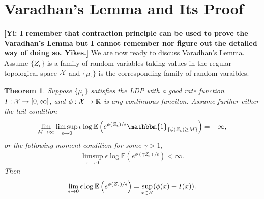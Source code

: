 \documentclass[10pt]{article}
\def\X{{\cal X}}
\newcommand{\e}{\mathbb{E}}
\newcommand{\gy}[1]{\textbf{\color{red}[Yi: #1]}}
\newtheorem{theorem}{\bf Theorem}
\newenvironment{Proof of lemma}{\noindent{\bf Proof of Lemma}}{\hfill$\Box$\newline}
\newenvironment{Proof of claim}{\noindent{\bf Proof of claim}}{\hfill$\Box$\newline}
\newenvironment{Proof of theorem}{\noindent{\bf Proof of Theorem}}{\hfill\scriptsize{$\Box$}\newline}
\newenvironment{Proof of theorems}{\noindent{\bf Proof of Theorems}}{\hfill$\Box$\newline}
\newenvironment{Proof of proposition}{\noindent{\bf Proof of Proposition}}{\hfill$\Box$\newline}
\newenvironment{Proof of propositions}{\noindent{\bf Proof of Propositions}}{\hfill$\Box$\newline}
\newenvironment{Proof of exercise}{\noindent{\it Proof of Exercise:}}{\hfill$\Box$}
\numberwithin{equation}{section}
\begin{document}
\section{Varadhan's Lemma and Its Proof}
\gy{I remember that contraction principle can be used to prove the Varadhan's Lemma but I cannot remember nor figure out the detailed way of doing so. Yikes.}
We are now ready to discuss Varadhan's Lemma. Assume $\{Z_{\epsilon}\}$ is a family of random variables taking values in the regular topological space $\X$ and $\{\mu_{\epsilon}\}$ is the corresponding family of random varaibles.
\begin{theorem}
    Suppose $\{\mu_{\epsilon}\}$ satisfies the LDP with a good rate function $I: \X \to [0,\infty]$, and $\phi: \X \to \mathbb{R}$ is any continuous funciton. Assume further either the tail condition
    \begin{align} \label{vara_tail_cond}
        \lim_{M \to \infty} \limsup_{\epsilon \to 0} \epsilon \log \e \left(e^{\phi(Z_{\epsilon})/\epsilon}\mathbbm{1}_{\{\phi(Z_{\epsilon}) \geq M\}}\right) = -\infty,
    \end{align}
    or the following moment condition for some $\gamma >1$,
    \begin{align} \label{vara_moment_cond}
        \limsup_{\epsilon \to 0}\epsilon \log \e \left(e^{\phi(\gamma Z_{\epsilon})/\epsilon}\right) < \infty.
    \end{align}
    Then
    \begin{align}
        \lim_{\epsilon \to 0} \epsilon \log \e \left(e^{\phi(Z_{\epsilon})/\epsilon}\right) = \sup_{x \in \X}(\phi(x)-I(x)).
    \end{align}
\end{theorem}
\end{document}
